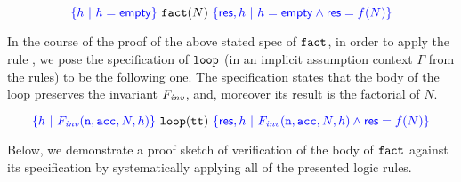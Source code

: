 \[
\textcolor{blue}{\left\{{h ~|~ h = \mathsf{empty}}\right\}} ~\mathtt{fact}(N)~ \textcolor{blue}{\left\{{\mathsf{res}, h ~|~ h = \mathsf{empty} \wedge \mathsf{res} = f(N)}\right\}}
\]

In the course of the proof of the above stated spec of $\mathtt{fact}$,
in order to apply the rule , we pose the specification of
$\mathtt{loop}$ (in an implicit assumption context $\Gamma$ from the
rules) to be the following one. The specification states that the body
of the loop preserves the invariant $F_{\mathit{inv}}$, and, moreover its result
is the factorial of $N$.

\[
\textcolor{blue}{\left\{{h ~|~ F_{\mathit{inv}}(\mathtt{n}, \mathtt{acc}, N, h)}\right\}} ~\mathtt{loop}(\mathtt{tt})~ \textcolor{blue}{\left\{{\mathsf{res}, h ~|~ F_{\mathit{inv}}(\mathtt{n}, \mathtt{acc}, N, h) \wedge \mathsf{res} = f(N)}\right\}}
\]

Below, we demonstrate a proof sketch of verification of the body of
$\mathtt{fact}$ against its specification by systematically applying all
of the presented logic rules.

